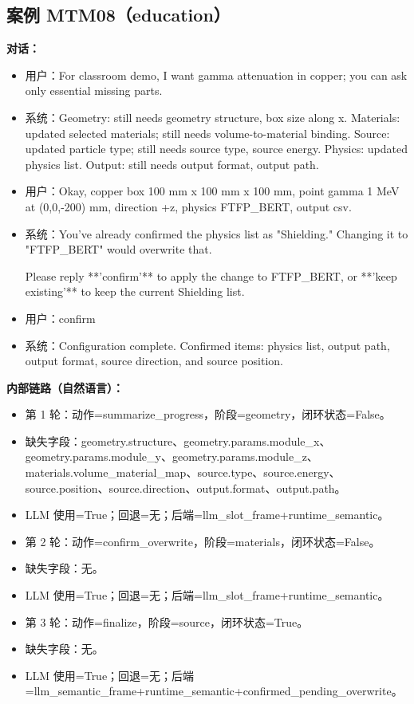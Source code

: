 \documentclass[11pt]{ctexart}
\begin{document}
\subsection{案例 MTM08（education）}
\textbf{对话：}
\begin{itemize}
\item 用户：For classroom demo, I want gamma attenuation in copper; you can ask only essential missing parts.
\item 系统：Geometry: still needs geometry structure, box size along x. Materials: updated selected materials; still needs volume-to-material binding. Source: updated particle type; still needs source type, source energy. Physics: updated physics list. Output: still needs output format, output path.
\item 用户：Okay, copper box 100 mm x 100 mm x 100 mm, point gamma 1 MeV at (0,0,-200) mm, direction +z, physics FTFP\_BERT, output csv.
\item 系统：You've already confirmed the physics list as "Shielding." Changing it to "FTFP\_BERT" would overwrite that.

Please reply **'confirm'** to apply the change to FTFP\_BERT, or **'keep existing'** to keep the current Shielding list.
\item 用户：confirm
\item 系统：Configuration complete. Confirmed items: physics list, output path, output format, source direction, and source position.
\end{itemize}
\textbf{内部链路（自然语言）：}
\begin{itemize}
\item 第 1 轮：动作=summarize\_progress，阶段=geometry，闭环状态=False。
\item 缺失字段：geometry.structure、geometry.params.module\_x、geometry.params.module\_y、geometry.params.module\_z、materials.volume\_material\_map、source.type、source.energy、source.position、source.direction、output.format、output.path。
\item LLM 使用=True；回退=无；后端=llm\_slot\_frame+runtime\_semantic。
\item 第 2 轮：动作=confirm\_overwrite，阶段=materials，闭环状态=False。
\item 缺失字段：无。
\item LLM 使用=True；回退=无；后端=llm\_slot\_frame+runtime\_semantic。
\item 第 3 轮：动作=finalize，阶段=source，闭环状态=True。
\item 缺失字段：无。
\item LLM 使用=True；回退=无；后端=llm\_semantic\_frame+runtime\_semantic+confirmed\_pending\_overwrite。
\end{itemize}
\end{document}
